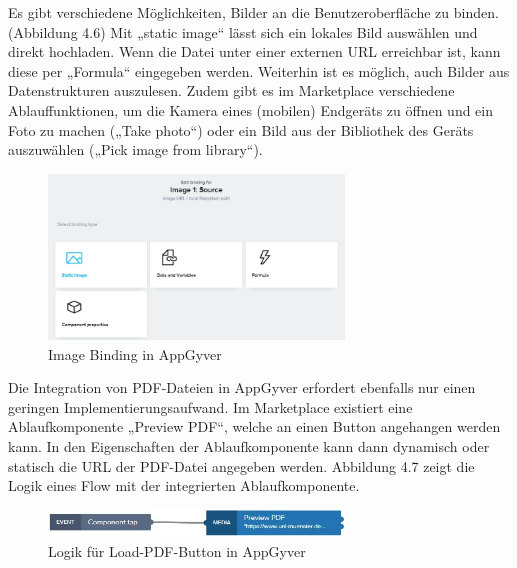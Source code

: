 Es gibt verschiedene Möglichkeiten, Bilder an die Benutzeroberfläche zu binden. (Abbildung 4.6) Mit „static image“ lässt sich ein lokales Bild auswählen und direkt hochladen. Wenn die Datei unter einer externen URL erreichbar ist, kann diese per „Formula“ eingegeben werden. Weiterhin ist es möglich, auch Bilder aus Datenstrukturen auszulesen. Zudem gibt es im Marketplace verschiedene Ablauffunktionen, um die Kamera eines (mobilen) Endgeräts zu öffnen und ein Foto zu machen („Take photo“) oder ein Bild aus der Bibliothek des Geräts auszuwählen („Pick image from library“).

\begin{figure}[htbp]
 \centering
 \includegraphics[width=0.7\textwidth]{Bilder/appgyver/4_6_Image_binding_in_AppGyver.jpg}
 \caption{Image Binding in AppGyver}
\end{figure}

Die Integration von PDF-Dateien in AppGyver erfordert ebenfalls nur einen geringen Implementierungsaufwand. Im Marketplace existiert eine Ablaufkomponente „Preview PDF“, welche an einen Button angehangen werden kann. In den Eigenschaften der Ablaufkomponente kann dann dynamisch oder statisch die URL der PDF-Datei angegeben werden. Abbildung 4.7 zeigt die Logik eines Flow mit der integrierten Ablaufkomponente. 

\begin{figure}[htbp]
 \centering
 \includegraphics[width=0.7\textwidth]{Bilder/appgyver/4_7_Logik_Load-PDF-Button.jpg}
 \caption{Logik für Load-PDF-Button in AppGyver}
\end{figure}

